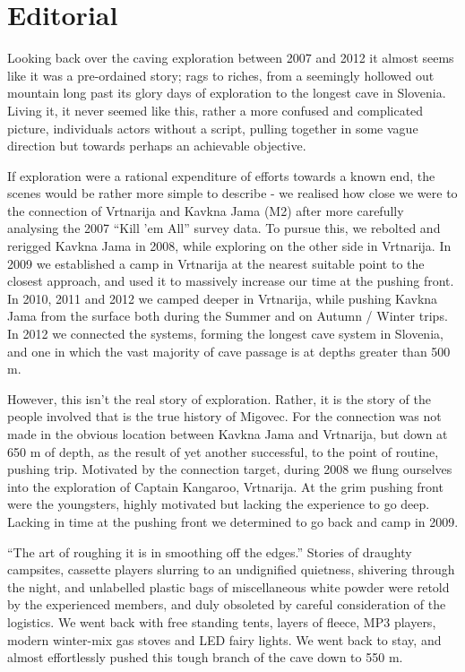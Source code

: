 \chapter*{Editorial}

Looking back over the caving exploration between 2007 and 2012 it almost
seems like it was a pre-ordained story; rags to riches, from a seemingly
hollowed out mountain long past its glory days of exploration to the
longest cave in Slovenia. Living it, it never seemed like this, rather a
more confused and complicated picture, individuals actors without a
script, pulling together in some vague direction but towards perhaps an
achievable objective.

If exploration were a rational expenditure of efforts towards a known
end, the scenes would be rather more simple to describe - we realised
how close we were to the connection of Vrtnarija and Kavkna Jama (M2)
after more carefully analysing the 2007 ``Kill 'em All'' survey data. To
pursue this, we rebolted and rerigged Kavkna Jama in 2008, while
exploring on the other side in Vrtnarija. In 2009 we established a camp
in Vrtnarija at the nearest suitable point to the closest approach, and
used it to massively increase our time at the pushing front. In 2010,
2011 and 2012 we camped deeper in Vrtnarija, while pushing Kavkna Jama
from the surface both during the Summer and on Autumn / Winter trips. In
2012 we connected the systems, forming the longest cave system in
Slovenia, and one in which the vast majority of cave passage is at
depths greater than 500 m.

However, this isn't the real story of exploration. Rather, it is the
story of the people involved that is the true history of Migovec. For
the connection was not made in the obvious location between Kavkna Jama
and Vrtnarija, but down at 650 m of depth, as the result of yet another
successful, to the point of routine, pushing trip. Motivated by the
connection target, during 2008 we flung ourselves into the exploration
of Captain Kangaroo, Vrtnarija. At the grim pushing front were the
youngsters, highly motivated but lacking the experience to go deep.
Lacking in time at the pushing front we determined to go back and camp
in 2009.

``The art of roughing it is in smoothing off the edges.'' Stories of
draughty campsites, cassette players slurring to an undignified
quietness, shivering through the night, and unlabelled plastic bags of
miscellaneous white powder were retold by the experienced members, and
duly obsoleted by careful consideration of the logistics. We went back
with free standing tents, layers of fleece, MP3 players, modern
winter-mix gas stoves and LED fairy lights. We went back to stay, and
almost effortlessly pushed this tough branch of the cave down to 550 m.

